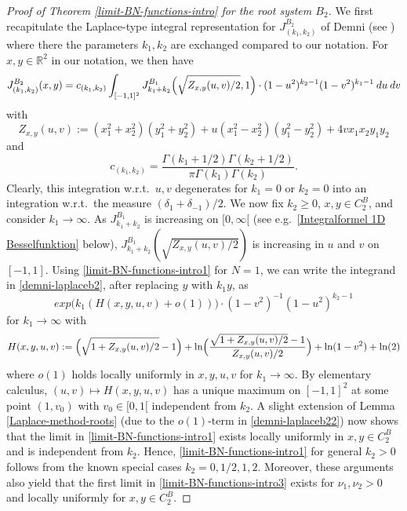 \documentclass[reqno]{amsart}
\theoremstyle{plain}
\theoremstyle{definition}
\numberwithin{equation}{section}
\begin{document}
\begin{proof}[Proof of Theorem \ref{limit-BN-functions-intro} for the root system $B_2$]
  
  We first recapitulate the Laplace-type integral representation for $J_{(k_1,k_2)}^{B_2}$ of Demni (see \cite{De, AD}) where there the
  parameters $k_1,k_2$ are exchanged compared to our notation. For $x,y\in \mathbb R^2$  in our notation, we then have
  \begin{equation}\label{demni-laplaceb2}
    J_{(k_1,k_2)}^{B_2}(x,y)= c_{(k_1,k_2)}\int_{[-1,1]^2} J_{k_1+k_2}^{B_1}\Bigl(\sqrt{Z_{x,y}(u,v)/2},1\Bigr)\cdot (1-u^2)^{k_2-1}(1-v^2)^{k_1-1} \> du\> dv
  \end{equation}
  with
  $$Z_{x,y}(u,v):= (x_1^2+x_2^2)(y_1^2+y_2^2) +u     (x_1^2-x_2^2)(y_1^2-y_2^2) +4v  x_1 x_2 y_1 y_2$$
  and
  $$c_{(k_1,k_2)} =\frac{\Gamma(k_1+1/2)\Gamma(k_2+1/2)}{\pi \Gamma(k_1)\Gamma(k_2)}.$$
  Clearly, this integration w.r.t.~$u,v$ degenerates for $k_1=0$ or $k_2=0$ into an integration  w.r.t.~the measure
$(\delta_1+\delta_{-1})/2$.
  We now fix $k_2\ge0$, $x,y\in C_2^B$, and consider  $k_1\to\infty$.
As $ J_{k_1+k_2}^{B_1}$ is increasing on $[0,\infty[$ (see e.g.~\eqref{Integralformel 1D Besselfunktion} below),
    $J_{k_1+k_2}^{B_1}(\sqrt{Z_{x,y}(u,v)/2})$ is increasing in $u$ and   $v$ on $[-1,1]$.
    Using \eqref{limit-BN-functions-intro1} for $N=1$, we can write the integrand in \eqref{demni-laplaceb2}, after replacing $y$ with $k_1 y$, as
    \begin{equation}\label{demni-laplaceb22} exp\bigl( k_1( H(x,y,u,v) +o(1))\bigr)
        \cdot(1-v^2)^{-1} (1-u^2)^{k_2-1}
        \end{equation}
 for $k_1\to\infty$     with
 \begin{equation}\label{demni-exp-form}
   H(x,y,u,v) :=    \Bigl( \sqrt{1+Z_{x,y}(u,v)/2}-1\Bigr) + \ln\Bigl(\frac{\sqrt{1+Z_{x,y}(u,v)/2}-1}{Z_{x,y}(u,v)/2}\Bigr) + \ln (1-v^2) + \ln(2)
 \end{equation}
 where $o(1)$ holds locally uniformly in $x,y,u,v$ for $k_1\to\infty$.
 By elementary calculus,
      $(u,v)\mapsto H(x,y,u,v)$ has a unique maximum on $[-1,1]^2$ at some point $(1,v_0)$
      with  $v_0\in [0,1[$ independent from $k_2$. 
       A slight extension of Lemma \ref{Laplace-method-roots}  (due to the $o(1)$-term
        in \eqref{demni-laplaceb22}) now shows
      that the limit in \eqref{limit-BN-functions-intro1}
      exists locally uniformly in $x,y\in C_2^B$ and is independent from $k_2$. Hence, \eqref{limit-BN-functions-intro1} for general $k_2>0$
      follows from the known special cases $k_2=0,1/2,1,2$. Moreover, these arguments also yield that the first limit in
      \eqref{limit-BN-functions-intro3} exists for $\nu_1,\nu_2>0$ and locally  uniformly for $x,y\in C_2^B$.



\end{proof}
\end{document}
